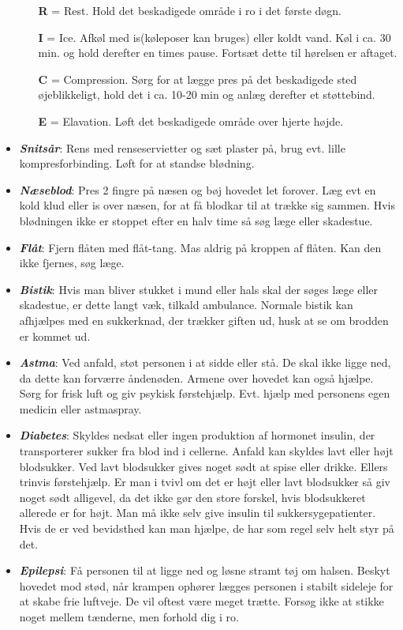 \begin{itemize}
\begin{itemize}
\item[{\color{red}\textbf{R}} =] Rest. Hold det beskadigede område i ro i det første døgn.
\item[{\color{red}\textbf{I}} =] Ice. Afkøl med is(køleposer kan bruges) eller koldt vand. Køl i ca. 30 min. og hold derefter en times pause. Fortsæt dette til hørelsen er aftaget.
\item[{\color{red}\textbf{C}} =] Compression. Sørg for at lægge pres på det beskadigede sted øjeblikkeligt, hold det i ca. 10-20 min og anlæg derefter et støttebind. 
\item[{\color{red}\textbf{E}} =] Elavation. Løft det beskadigede område over hjerte højde. \\
\end{itemize}
\item \textbf{\textit{Snitsår}}: Rens med renseservietter og sæt plaster på, brug evt. lille kompresforbinding. Løft for at standse blødning.\\
\item \textbf{\textit{Næseblod}}: Pres 2 fingre på næsen og bøj hovedet let forover. Læg evt en kold klud eller is over næsen, for at få blodkar til at trække sig sammen. Hvis blødningen ikke er stoppet efter en halv time så søg læge eller skadestue. \\
\item \textbf{\textit{Flåt}}: Fjern flåten med flåt-tang. Mas aldrig på kroppen af flåten. Kan den ikke fjernes, søg læge. \\
\item \textbf{\textit{Bistik}}: Hvis man bliver stukket i  mund eller hals skal der søges læge eller skadestue, er dette langt væk, tilkald ambulance. Normale bistik kan afhjælpes med en sukkerknad, der trækker giften ud, husk at se om brodden er kommet ud. \\
\item \textbf{\textit{Astma}}: Ved anfald, støt personen i at sidde eller stå. De skal ikke ligge ned, da dette kan forværre åndenøden. Armene over hovedet kan også hjælpe. Sørg for frisk luft og giv psykisk førstehjælp. Evt. hjælp med personens egen medicin eller astmaspray. \\
\item \textbf{\textit{Diabetes}}: Skyldes nedsat eller ingen produktion af hormonet insulin, der transporterer sukker fra blod ind i cellerne. Anfald kan skyldes lavt eller højt blodsukker. Ved lavt blodsukker gives noget sødt at spise eller drikke. Ellers trinvis førstehjælp. Er man i tvivl om det er højt eller lavt blodsukker så giv noget sødt alligevel, da det ikke gør den store forskel, hvis blodsukkeret allerede er for højt. Man må ikke selv give insulin til sukkersygepatienter. Hvis de er ved bevidsthed kan man hjælpe, de har som regel selv helt styr på det. \\
\item \textbf{\textit{Epilepsi}}: Få personen til at ligge ned og løsne stramt tøj om halsen. Beskyt hovedet mod stød, når krampen ophører lægges personen i stabilt sideleje for at skabe frie luftveje. De vil oftest være meget trætte. Forsøg ikke at stikke noget mellem tænderne, men forhold dig i ro.
\end{itemize}